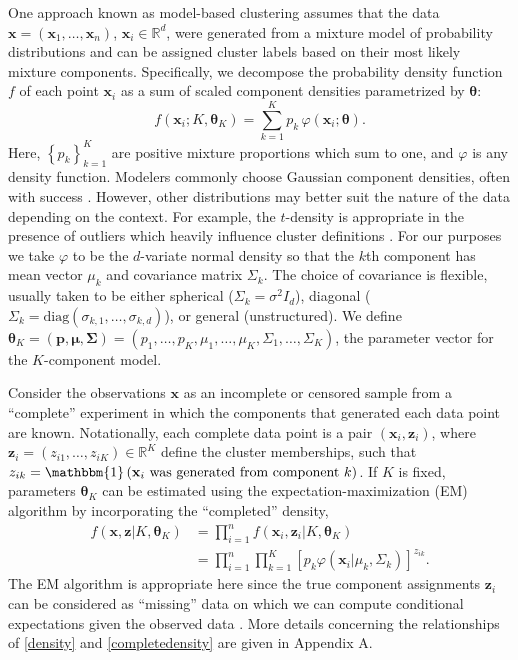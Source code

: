 \documentclass{uwstat572}
\newcommand*\reals{\mathbb{R}}
\newcommand*\ind[1]{\mathbbm{1}\left(#1\right)}
\newcommand*\set[1]{\left\{#1\right\}}
\newcommand*\bp{\mathbf{p}}
\newcommand*\bx{\mathbf{x}}
\newcommand*\bz{\mathbf{z}}
\newcommand*\btheta{\boldsymbol{\theta}}
\newcommand*\bmu{\boldsymbol{\mu}}
\newcommand*\bSigma{\boldsymbol{\Sigma}}
\renewcommand\;{\,}
\renewcommand\phi{\varphi}
\begin{document}
One approach known as model-based clustering assumes that the data $\bx = (\bx_1, \dotsc, \bx_n)$, $\bx_i \in \reals^d$, were generated from a mixture model of probability distributions and can be assigned cluster labels based on their most likely mixture components.
Specifically, we decompose the probability density function $f$ of each point $\bx_i$ as a sum of scaled component densities parametrized by $\btheta$:
\begin{equation}\label{density}
f(\bx_i ; K, \btheta_K)
	 = \sum_{k=1}^K p_k \; \phi(\bx_i ; \btheta).
\end{equation}
Here, $\set{p_k}_{k = 1}^K$ are positive mixture proportions which sum to one, and $\phi$ is any density function.
Modelers commonly choose Gaussian component densities, often with success \citep{Murtagh84, Banfield93, Dasgupta98, Campbell97, Celeux95, Mukerjee98}.
However, other distributions may better suit the nature of the data depending on the context.
For example, the $t$-density is appropriate in the presence of outliers which heavily influence cluster definitions \citep{Peel00}.
For our purposes we take $\phi$ to be the $d$-variate normal density so that the $k$th component has mean vector $\mu_k$ and covariance matrix $\Sigma_k$.
The choice of covariance is flexible, usually taken to be either spherical ($\Sigma_k = \sigma^2 I_d$), diagonal ($\Sigma_k = \text{diag}(\sigma_{k,1}, \dotsc, \sigma_{k,d})$), or general (unstructured).
We define $\btheta_K = \left(\bp, \bmu, \bSigma\right) = \left(p_1, \dotsc, p_K, \mu_1, \dotsc, \mu_K, \Sigma_1, \dotsc, \Sigma_K\right)$, the parameter vector for the $K$-component model.

Consider the observations $\bx$ as an incomplete or censored sample from a ``complete'' experiment in which the components that generated each data point are known. Notationally, each complete data point is a pair $(\bx_i, \bz_i)$, where 
$\bz_i = (z_{i1}, \dotsc, z_{iK}) \in \reals^K$ define the cluster memberships, such that $z_{ik} = \ind{\bx_i \text{ was generated from component $k$}}$.  
If $K$ is fixed, parameters $\btheta_K$ can be estimated using the expectation-maximization (EM) algorithm by incorporating the ``completed'' density,
\begin{equation}\label{completedensity}
\begin{split}
f(\bx, \bz | K, \btheta_K)
	& = \prod_{i=1}^n f(\bx_i, \bz_i | K, \btheta_K) \\
	& = \prod_{i=1}^n \prod_{k=1}^K \left[ p_k \phi\left(\bx_i | \mu_k, \Sigma_k\right) \right]^{z_{ik}}.
\end{split}
\end{equation}
The EM algorithm is appropriate here since the true component assignments $\bz_i$ can be considered as ``missing'' data on which we can compute conditional expectations given the observed data \citep{McLachlan88, Dempster77}.
More details concerning the relationships of \eqref{density} and \eqref{completedensity} are given in Appendix A.
\end{document}
